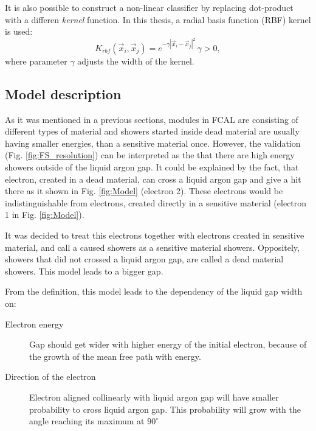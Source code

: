 It is also possible to construct a non-linear classifier by replacing dot-product with a differen \textit{kernel} function. In this thesis, a radial basis function (RBF) kernel is used:
\begin{equation}\label{eq:RBF}
K_{rbf}(\vec{x}_i, \vec{x}_j) = e^{-\gamma | \vec{x}_i - \vec{x}_j|^2} \, \gamma >0,
\end{equation}
where parameter $\gamma$ adjusts the width of the kernel.


\begin{figure}[!t]
\end{figure}

\subsection{Model description}



As it was mentioned in a previous sections, modules in FCAL are consisting of different types of material and showers started inside dead material are usually having smaller energies, than a sensitive material once. However, the validation (Fig. \ref{fig:FS_resolution}) can be interpreted as the that there are high energy showers outside of the liquid argon gap. It could be explained by the fact, that electron, created in a dead material, can cross a liquid argon gap and give a hit there as it shown in Fig. \ref{fig:Model} (electron 2). These electrons would be indistinguishable from electrons, created directly in a sensitive material (electron 1 in Fig. \ref{fig:Model}). 

It was decided to treat this electrons together with electrons created in sensitive material, and call a caused showers as a sensitive material showers. Oppositely, showers that did not crossed a liquid argon gap, are called a dead material showers. This model leads to a bigger gap.  

From the definition, this model leads to the dependency of the liquid gap width on:
\begin{description}

\item [Electron energy] Gap should get wider with higher energy of the initial electron, because of the growth of the mean free path with energy.
\item [Direction of the electron] Electron aligned collinearly with liquid argon gap will have smaller probability to cross liquid argon gap. This probability will grow with the angle reaching its maximum at  $90^{\circ}$

\end{description}

